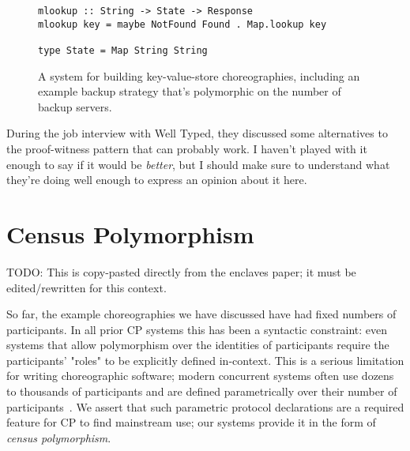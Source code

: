 \begin{figure*}
\begin{mdframed}
\begin{verbatim}
mlookup :: String -> State -> Response
mlookup key = maybe NotFound Found . Map.lookup key

type State = Map String String
\end{verbatim}
\caption{A system for building key-value-store choreographies,
         including an example backup strategy that's polymorphic on the number of backup servers.}
\label{fig:kvs}
\end{mdframed}
\end{figure*}

During the job interview with Well Typed, they discussed some alternatives to the proof-witness pattern that can probably work.
I haven't played with it enough to say if it would be \emph{better},
but I should make sure to understand what they're doing well enough to express an opinion about it here.

\section{Census Polymorphism}
\label{sec:census-poly}

TODO: This is copy-pasted directly from the enclaves paper; it must be edited/rewritten for this context.

So far, the example choreographies we have discussed have had fixed numbers of participants.
In all prior CP systems this has been a syntactic constraint:
even systems that allow polymorphism over the identities of participants require the participants' "roles" to be explicitly defined in-context.
This is a serious limitation for writing choreographic software;
modern concurrent systems often use dozens to thousands of participants
and are defined parametrically over their number of participants~\cite{bigConcurrent1, corrigan2017prio, bigConcurrent3, bigConcurrent4, dprio2023}.
We assert that such parametric protocol declarations are a required feature for CP to find mainstream use;
our systems provide it in the form of \emph{census polymorphism}.

